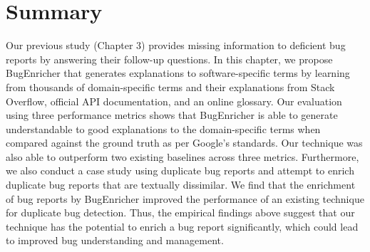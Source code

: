 \section{Summary} \label{Chap2:Summary}
Our previous study (Chapter 3) provides missing information to deficient bug reports by answering their follow-up questions. In this chapter, we propose BugEnricher that generates explanations to software-specific terms by learning from thousands of domain-specific terms and their explanations from Stack Overflow, official API documentation, and an online glossary. Our evaluation using three performance metrics shows that BugEnricher is able to generate understandable to good explanations to the domain-specific terms when compared against the ground truth as per Google's standards. Our technique was also able to outperform two existing baselines across three metrics. Furthermore, we also conduct a case study using duplicate bug reports and attempt to enrich duplicate bug reports that are textually dissimilar. We find that the enrichment of bug reports by BugEnricher improved the performance of an existing technique for duplicate bug detection. Thus, the empirical findings above suggest that our technique has the potential to enrich a bug report significantly, which could lead to improved bug understanding and management.